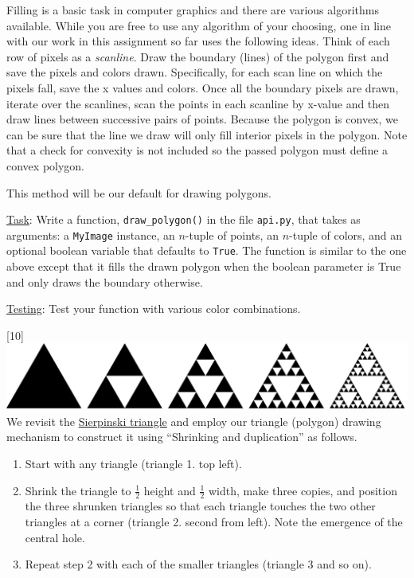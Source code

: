 \documentclass[addpoints]{exam}
\begin{document}
\begin{questions}
  Filling is a basic task in computer graphics and there are various algorithms available. While you are free to use any algorithm of your choosing, one in line with our work in this assignment so far uses the following ideas. Think of each row of pixels as a \textit{scanline}. Draw the boundary (lines) of the polygon first and save the pixels and colors drawn. Specifically, for each scan line on which the pixels fall, save the x values and colors. Once all the boundary pixels are drawn, iterate over the scanlines, scan the points in each scanline by x-value and then draw lines between successive pairs of points. 
  Because the polygon is convex, we can be sure that the line we draw will only fill interior pixels in the polygon. Note that a check for convexity is not included so the passed polygon must define a convex polygon.

  This method will be our default for drawing polygons.

  \underline{Task}: Write a function, \texttt{draw\_polygon()} in the file \texttt{api.py}, that takes as arguments: a \texttt{MyImage} instance, an $n$-tuple of points, an $n$-tuple of colors, and an optional boolean variable that defaults to \texttt{True}. The function is similar to the one above except that it fills the drawn polygon when the boolean parameter is True and only draws the boundary otherwise.

  \underline{Testing}: Test your function with various color combinations.

  \newpage
  [10]
    \includegraphics[width=\linewidth]{sierpinski}\\
  We revisit the \href{https://en.wikipedia.org/wiki/Sierpinski_triangle}{Sierpinski triangle} and employ our triangle (polygon) drawing mechanism to construct it using ``Shrinking and duplication'' as follows.
  \begin{enumerate}
  \item Start with any triangle (triangle 1. top left).
  \item Shrink the triangle to $\frac{1}{2}$ height and $\frac{1}{2}$ width, make three copies, and position the three shrunken triangles so that each triangle touches the two other triangles at a corner (triangle 2. second from left). Note the emergence of the central hole.
  \item Repeat step 2 with each of the smaller triangles (triangle 3 and so on).
  \end{enumerate}


\end{questions}
\end{document}
